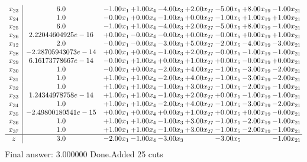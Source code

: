\documentclass[8pt]{article}
\begin{document}
\[\begin{array}{c| c c@{\hskip 2pt} c@{\hskip 2pt} c@{\hskip 2pt} c@{\hskip 2pt} c@{\hskip 2pt} c@{\hskip 2pt} c@{\hskip 2pt} }
 x_{23}   &  6.0 & -1.00 x_{1} & +  1.00 x_{4} & -4.00 x_{3} & +  2.00 x_{27} & -5.00 x_{5} & +  8.00 x_{19} & -1.00 x_{21}\\
 x_{24}   &  1.0 & -0.00 x_{1} & +  0.00 x_{4} & -1.00 x_{3} & +  0.00 x_{27} & -1.00 x_{5} & +  1.00 x_{19} & +  1.00 x_{21}\\
 x_{25}   &  6.0 & -1.00 x_{1} & +  1.00 x_{4} & -4.00 x_{3} & +  2.00 x_{27} & -5.00 x_{5} & +  8.00 x_{19} & -1.00 x_{21}\\
 x_{26}   &  2.22044604925e-16 & +  0.00 x_{1} & -0.00 x_{4} & -0.00 x_{3} & +  0.00 x_{27} & -0.00 x_{5} & +  0.00 x_{19} & +  1.00 x_{21}\\
 x_{12}   &  2.0 & -0.00 x_{1} & -0.00 x_{4} & -3.00 x_{3} & +  5.00 x_{27} & -2.00 x_{5} & -4.00 x_{19} & -3.00 x_{21}\\
 x_{28}   &  -2.28705943073e-14 & +  0.00 x_{1} & +  0.00 x_{4} & -1.00 x_{3} & +  2.00 x_{27} & -0.00 x_{5} & -1.00 x_{19} & -1.00 x_{21}\\
 x_{29}   &  6.16173778667e-14 & -0.00 x_{1} & +  1.00 x_{4} & +  0.00 x_{3} & +  1.00 x_{27} & +  0.00 x_{5} & -0.00 x_{19} & +  0.00 x_{21}\\
 x_{30}   &  1.0 & -0.00 x_{1} & +  0.00 x_{4} & -2.00 x_{3} & +  4.00 x_{27} & -1.00 x_{5} & -3.00 x_{19} & -2.00 x_{21}\\
 x_{31}   &  1.0 & +  1.00 x_{1} & +  1.00 x_{4} & -2.00 x_{3} & +  4.00 x_{27} & -1.00 x_{5} & -3.00 x_{19} & -2.00 x_{21}\\
 x_{32}   &  1.0 & +  1.00 x_{1} & +  1.00 x_{4} & -1.00 x_{3} & +  3.00 x_{27} & -1.00 x_{5} & -2.00 x_{19} & -1.00 x_{21}\\
 x_{33}   &  1.24344978758e-14 & +  1.00 x_{1} & +  1.00 x_{4} & -1.00 x_{3} & +  2.00 x_{27} & +  0.00 x_{5} & -1.00 x_{19} & -1.00 x_{21}\\
 x_{34}   &  1.0 & +  1.00 x_{1} & +  1.00 x_{4} & -2.00 x_{3} & +  4.00 x_{27} & -1.00 x_{5} & -3.00 x_{19} & -2.00 x_{21}\\
 x_{35}   &  -2.49800180541e-15 & +  0.00 x_{1} & +  0.00 x_{4} & +  0.00 x_{3} & +  1.00 x_{27} & +  0.00 x_{5} & +  0.00 x_{19} & -0.00 x_{21}\\
 x_{36}   &  1.0 & +  1.00 x_{1} & +  1.00 x_{4} & -1.00 x_{3} & +  3.00 x_{27} & -1.00 x_{5} & -2.00 x_{19} & -1.00 x_{21}\\
 x_{37}   &  1.0 & +  1.00 x_{1} & +  1.00 x_{4} & -1.00 x_{3} & +  3.00 x_{27} & -1.00 x_{5} & -2.00 x_{19} & -1.00 x_{21}\\
\hline
z    &  3.0 & -2.00 x_{1} & -1.00 x_{4} & -3.00 x_{3} &   & -3.00 x_{5} &   & -1.00 x_{21}\\
\end{array}\]
 Final answer: 3.000000 
Done.Added 25 cuts 
\end{document}
